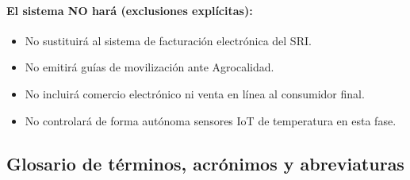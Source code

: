 \documentclass[11pt,a4paper]{article}
\begin{document}
\paragraph{El sistema NO hará (exclusiones explícitas):}
\begin{itemize}[nosep]
\item No sustituirá al sistema de facturación electrónica del SRI.
\item No emitirá guías de movilización ante Agrocalidad.
\item No incluirá comercio electrónico ni venta en línea al consumidor final.
\item No controlará de forma autónoma sensores IoT de temperatura en esta fase.
\end{itemize}

\subsection{Glosario de términos, acrónimos y abreviaturas}
\end{document}
